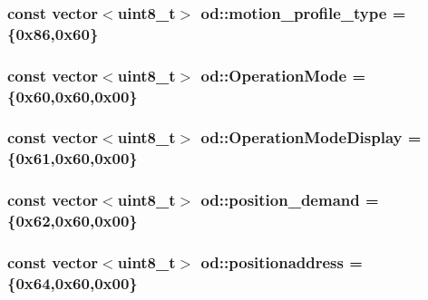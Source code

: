 \subsubsection[{\texorpdfstring{motion\+\_\+profile\+\_\+type}{motion_profile_type}}]{\setlength{\rightskip}{0pt plus 5cm}const vector$<$uint8\+\_\+t$>$ od\+::motion\+\_\+profile\+\_\+type =\{0x86,0x60\}}\hypertarget{namespaceod_a5256e8439c66da9ab7ad06fa5f72ec1a}{}\label{namespaceod_a5256e8439c66da9ab7ad06fa5f72ec1a}
\subsubsection[{\texorpdfstring{Operation\+Mode}{OperationMode}}]{\setlength{\rightskip}{0pt plus 5cm}const vector$<$uint8\+\_\+t$>$ od\+::\+Operation\+Mode =\{0x60,0x60,0x00\}}\hypertarget{namespaceod_a6f4fb30463057c20b9374a69826f6143}{}\label{namespaceod_a6f4fb30463057c20b9374a69826f6143}
\subsubsection[{\texorpdfstring{Operation\+Mode\+Display}{OperationModeDisplay}}]{\setlength{\rightskip}{0pt plus 5cm}const vector$<$uint8\+\_\+t$>$ od\+::\+Operation\+Mode\+Display =\{0x61,0x60,0x00\}}\hypertarget{namespaceod_a0469b45cd9158b638f0e0d6ed1102742}{}\label{namespaceod_a0469b45cd9158b638f0e0d6ed1102742}
\subsubsection[{\texorpdfstring{position\+\_\+demand}{position_demand}}]{\setlength{\rightskip}{0pt plus 5cm}const vector$<$uint8\+\_\+t$>$ od\+::position\+\_\+demand =\{0x62,0x60,0x00\}}\hypertarget{namespaceod_a1d5963cb8a002987c96fae2e172790ee}{}\label{namespaceod_a1d5963cb8a002987c96fae2e172790ee}
\subsubsection[{\texorpdfstring{positionaddress}{positionaddress}}]{\setlength{\rightskip}{0pt plus 5cm}const vector$<$uint8\+\_\+t$>$ od\+::positionaddress =\{0x64,0x60,0x00\}}\hypertarget{namespaceod_a716df35f1a3cc3e1792c033be7fc0518}{}\label{namespaceod_a716df35f1a3cc3e1792c033be7fc0518}
